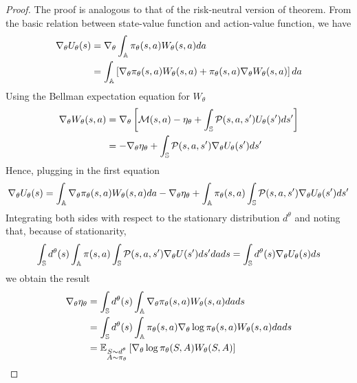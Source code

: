\begin{proof}
	The proof is analogous to that of the risk-neutral version of theorem. From the basic relation between state-value function and action-value function, we have
		\begin{equation*}
			\begin{split}
				\nabla_\theta U_\theta(s) &= \nabla_\theta \int_{\A} \pi_\theta(s,a) W_\theta(s,a) da\\
					&= \int_{\A} \left[ \nabla_\theta \pi_\theta(s,a) W_\theta(s,a) + \pi_\theta(s,a) \nabla_\theta W_\theta(s,a)\right] da
			\end{split}
		\end{equation*} 
		Using the Bellman expectation equation for $W_\theta$ 
		\begin{equation*}
			\begin{split}
				\nabla_\theta W_\theta(s,a) &= \nabla_\theta \left[ \calM(s,a) - \eta_\theta + \int_{\S} \calP(s,a,s') U_\theta(s') ds' \right]\\
				&= -\nabla_\theta \eta_\theta + \int_{\S} \calP(s,a,s') \nabla_\theta U_\theta(s') ds'
			\end{split}
		\end{equation*}
		Hence, plugging in the first equation 
		\begin{equation*}
				\nabla_\theta U_\theta(s) = \int_{\A} \nabla_\theta \pi_\theta(s,a) W_\theta(s,a) da - \nabla_\theta \eta_\theta + \int_\A \pi_\theta(s,a) \int_{\S} \calP(s,a,s') \nabla_\theta U_\theta(s') ds' 
		\end{equation*} 	
		Integrating both sides with respect to the stationary distribution $d^\theta$ and noting that, because of stationarity,  
		\begin{equation*}
			\int_{\S} d^\theta(s) \int_{\A} \pi(s,a) \int_{\S} \calP(s,a,s') \nabla_\theta U(s') ds' da ds = \int_{\S} d^\theta(s) \nabla_\theta U_\theta(s) ds
		\end{equation*}
		we obtain the result 
		\begin{equation*}
			\begin{split}
			\nabla_\theta \eta_\theta &= \int_{\S} d^\theta(s) \int_{\A} \nabla_\theta \pi_\theta(s,a) W_\theta(s,a) da ds\\
			&= \int_{\S} d^\theta(s) \int_{\A} \pi_\theta(s,a) \nabla_\theta \log\pi_\theta(s,a) W_\theta(s,a) da ds\\
			&= \E[\substack{S \sim d^\theta\\A \sim \pi_\theta}]{\nabla_\theta\log
					\pi_\theta(S,A) W_{\theta}(S, A)} 
			\end{split}
		\end{equation*}
\end{proof}
